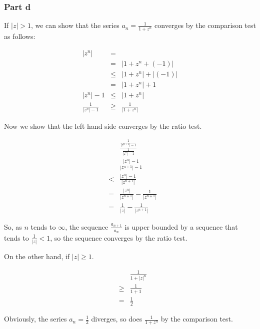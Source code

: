 \subsubsection*{Part d}
If $ |z| > 1 $, we can show that the series $ a_n = \frac{1}{1 + z^n} $ converges by the comparison test as follows:

\begin{eqnarray*}
                |z^n| &=   &  \\
                      &=   & |1 + z^n + (-1)| \\
                      &\le & |1 + z^n| + |(-1)| \\
                      &=   & |1 + z^n| + 1  \\
            |z^n| - 1 &\le & |1 + z^n| \\
  \frac{1}{|z^n| - 1} &\ge & \frac{1}{|1 + z^n|}
\end{eqnarray*}

Now we show that the left hand side converges by the ratio test.

\begin{eqnarray*}
  & & \frac{\frac{1}{|z^{n+1}| - 1}}{\frac{1}{|z^n| - 1}} \\
  &=& \frac{|z^n| - 1}{|z^{n+1}| - 1} \\
  &<& \frac{|z^n| - 1}{|z^{n+1}|} \\
  &=& \frac{|z^n|}{|z^{n+1}|} - \frac{1}{|z^{n+1}|} \\
  &=& \frac{1}{|z|} - \frac{1}{|z^{n+1}|}
\end{eqnarray*}

So, as $ n $ tends to $ \infty $, the sequence $ \frac{a_{n+1}}{a_n} $ is upper bounded by a sequence that tends to $ \frac{1}{|z|} < 1 $, so the sequence converges by the ratio test.

On the other hand, if $ |z| \ge 1 $.

\begin{eqnarray*}
  &   & \frac{1}{1 + |z|^n} \\
  &\ge& \frac{1}{1 + 1} \\
  &=  & \frac{1}{2}
\end{eqnarray*}

Obviously, the series $ a_n = \frac{1}{2} $ diverges, so does $ \frac{1}{1 + z^n} $ by the comparison test.